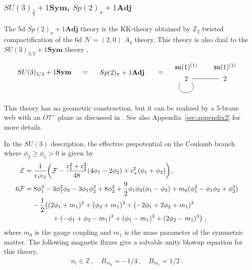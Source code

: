 \subsubsection{\texorpdfstring{$SU(3)_{\frac{3}{2}}+1\mathbf{Sym}$, $Sp(2)_\pi+1\mathbf{Adj}$}{SU(3)3/2 + 1Sym}}

The 5d $ Sp(2)_\pi + 1\mathbf{Adj} $ theory is the KK-theory obtained by $ \mathbb{Z}_2 $ twisted compactification of the 6d $ \mathcal{N}=(2, 0) $ $ A_4 $ theory. This theory is also dual to the $ SU(3)_{3/2} + 1\mathbf{Sym} $ theory \cite{Jefferson:2017ahm},
\begin{align}
\begin{tikzpicture}
\draw (0, 0) node {$ SU(3)_{3/2} + 1\mathbf{Sym} $}
(2.1, 0) node {$ = $}
(4, 0) node {$ Sp(2)_\pi + 1\mathbf{Adj} $}
(6, 0) node {$ = $}
(7.3, 0.3) node {$ \mathfrak{su}(1)^{(1)} $}
(7.3, -0.3) node {$ 2 $}
(9.3, 0.3) node {$ \mathfrak{su}(1)^{(1)} $}
(9.3, -0.3) node {$ 2 $}
(7.6, -0.3) -- (9.0, -0.3);
\draw (7.0, -0.5) .. controls (6.6, -1.2) and (8.0, -1.2) .. (7.6, -0.5);
\end{tikzpicture}
\end{align}
This theory has no geometric construction, but it can be realized by a 5-brane web with an $O7^+$ plane as discussed in \cite{Hayashi:2018lyv}. See also Appendix~\ref{sec:appendix2} for more details. 

In the $ SU(3) $ description, the effective prepotential on the Coulomb branch where $\phi_2\ge \phi_1>0$ is given by
\begin{align}
\mathcal{E} & = \frac{1}{\epsilon_1 \epsilon_2} \qty(\mathcal{F} - \frac{\epsilon_1^2 + \epsilon_2^2}{48} \qty(4\phi_1 - 2\phi_2) + \epsilon_+^2 (\phi_1 + \phi_2) ) \,, \nonumber \\
6\mathcal{F}
&= 8\phi_1^3 - 3\phi_1^2 \phi_2 - 3\phi_1 \phi_2^2 + 8\phi_2^2 + \frac{9}{2} \phi_1 \phi_2 (\phi_1 - \phi_2) + m_0 (\phi_1^2 - \phi_1 \phi_2 + \phi_2^2) \nonumber \\
& \quad - \frac{1}{2} \big( (2\phi_1 + m_1)^3 + (\phi_2 + m_1)^3 + (-2\phi_1 + 2\phi_2 + m_1)^3 \nonumber \\
& \qquad \qquad + (-\phi_1 + \phi_2 - m_1)^3 + (\phi_1 - m_1)^3 + (2\phi_2 - m_1)^3 \big) \ ,
\end{align}
where $ m_0 $ is the gauge coupling and $ m_1 $ is the mass parameter of the symmetric matter. The following magnetic fluxes give a solvable unity blowup equation for this theory, 
\begin{align}\label{eq:su3_sym_flux}
n_i \in \mathbb{Z} \, , \quad
B_{m_0} = -1/4 \, , \quad
B_{m_1} = 1/2 \ .
\end{align}

